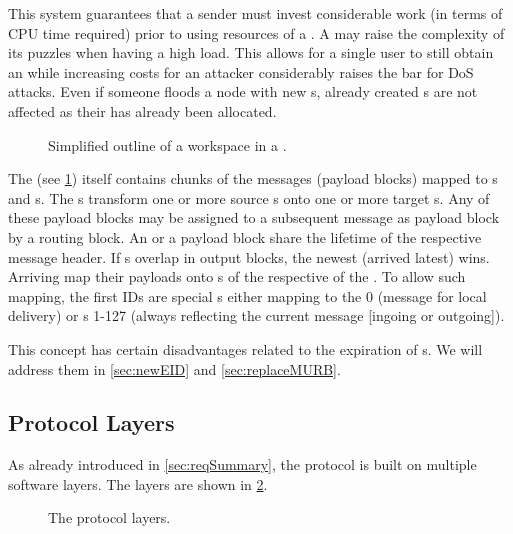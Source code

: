 This system guarantees that a sender must invest considerable work (in terms of CPU time required) prior to using resources of a \VortexNode. A \VortexNode{} may raise the complexity of its puzzles when having a high load. This allows for a single user to still obtain an  while increasing costs for an attacker considerably raises the bar for DoS attacks. Even if someone floods a node with new s, already created s are not affected as their  has already been allocated.

\begin{figure}[ht]
	\centering\resizebox{.95\linewidth}{!}{
		
	}
	\caption{Simplified outline of a workspace in a \VortexNode.}
	\label{fig:workspace}
\end{figure}


The  (see \cref{fig:workspace}) itself contains chunks of the messages (payload blocks) mapped to s and s. The s transform one or more source s onto one or more target s. Any of these payload blocks may be assigned to a subsequent message as payload block by a routing block. An  or a payload block share the lifetime of the respective message header. If s overlap in output blocks, the newest  (arrived latest) wins. Arriving \VortexMessages{} map their payloads onto s of the respective  of the . To allow such mapping, the first IDs are special s either mapping to the  0 (message for local delivery) or s 1-127 (always reflecting the current message [ingoing or outgoing]).

This concept has certain disadvantages related to the expiration of s. We will address them in \cref{sec:newEID} and \ref{sec:replaceMURB}.

\subsection{Protocol Layers}
As already introduced in \cref{sec:reqSummary}, the protocol is built on multiple software layers. The layers are shown in \cref{fig:protocolLayers}.

\begin{figure}[H]
	\resizebox{0.95\textwidth}{!}{}
	\caption{The protocol layers.}
	\label{fig:protocolLayers}
\end{figure} %

